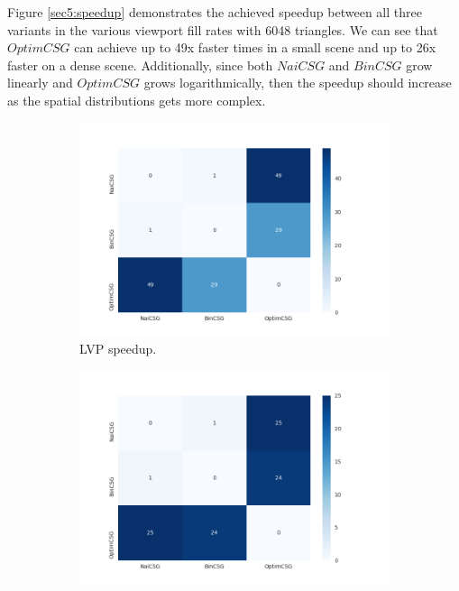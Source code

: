 \documentclass[a4paper,11pt,oneside]{article}
\begin{document}
Figure \ref{sec5:speedup} demonstrates the achieved speedup between all three variants in the various viewport fill rates with 6048 triangles. We can see that $OptimCSG$ can achieve up to 49x faster times in a small scene and up to 26x faster on a dense scene. Additionally, since both $NaiCSG$ and $BinCSG$ grow linearly and $OptimCSG$ grows logarithmically, then the speedup should increase as the spatial distributions gets more complex.

\begin{figure}[ht]
	\centering
	\begin{subfigure}[b]{0.3\textwidth}
		\centering
		\includegraphics[width=\linewidth]{section5/plots/speedup_lvp.png}
		\caption{LVP speedup.}
		\label{sec5:speedup-lvp}
	\end{subfigure}
	\begin{subfigure}[b]{0.3\textwidth}
		\centering
		\includegraphics[width=\linewidth]{section5/plots/speedup_mvp.png}

\end{subfigure}
\end{figure}
\end{document}
